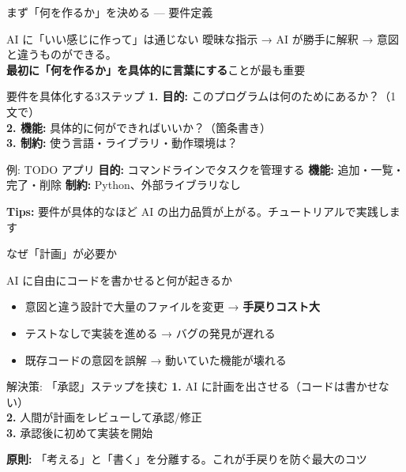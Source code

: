 \documentclass[aspectratio=169, 14pt]{beamer}
\newcommand{\warn}[1]{\textcolor{sfred}{\textbf{#1}}}
\begin{document}
\begin{frame}{まず「何を作るか」を決める — 要件定義}
  \begin{alertblock}{AI に「いい感じに作って」は通じない}
    {\footnotesize
    曖昧な指示 → AI が勝手に解釈 → 意図と違うものができる。\\
    \warn{最初に「何を作るか」を具体的に言葉にする}ことが最も重要}
  \end{alertblock}

  \begin{exampleblock}{要件を具体化する3ステップ}
    {\footnotesize
    \textbf{1. 目的:} このプログラムは何のためにあるか？（1文で）\\
    \textbf{2. 機能:} 具体的に何ができればいいか？（箇条書き）\\
    \textbf{3. 制約:} 使う言語・ライブラリ・動作環境は？}
  \end{exampleblock}

  \begin{block}{例: TODO アプリ}
    {\scriptsize
    \textbf{目的:} コマンドラインでタスクを管理する \quad
    \textbf{機能:} 追加・一覧・完了・削除 \quad
    \textbf{制約:} Python、外部ライブラリなし}
  \end{block}

  {\scriptsize \textbf{Tips:} 要件が具体的なほど AI の出力品質が上がる。チュートリアルで実践します}
\end{frame}

\begin{frame}{なぜ「計画」が必要か}
  \begin{alertblock}{AI に自由にコードを書かせると何が起きるか}
    \begin{itemize}\small
      \item 意図と違う設計で大量のファイルを変更 → \warn{手戻りコスト大}
      \item テストなしで実装を進める → バグの発見が遅れる
      \item 既存コードの意図を誤解 → 動いていた機能が壊れる
    \end{itemize}
  \end{alertblock}

  \vspace{0.5em}

  \begin{exampleblock}{解決策: 「承認」ステップを挟む}
    {\small
    \textbf{1.} AI に計画を出させる（コードは書かせない）\\
    \textbf{2.} 人間が計画をレビューして承認/修正 \\
    \textbf{3.} 承認後に初めて実装を開始
    }
  \end{exampleblock}

  \vspace{0.3em}

  {\footnotesize \textbf{原則:} 「考える」と「書く」を分離する。これが手戻りを防ぐ最大のコツ}
\end{frame}
\end{document}
